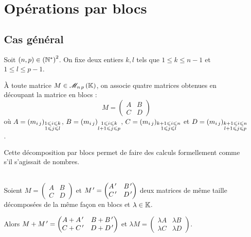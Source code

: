 \section{Opérations par blocs}

\subsection{Cas général}

Soit \(\left(n,p\right)\in\left(\mathbb{N}^*\right)^2\). On fixe deux entiers \(k,l\) tels que \(1\leq k\leq n-1\) et \(1\leq l\leq p-1\).

À toute matrice \(M\in\M{n\,p}\), on associe quatre matrices obtenues en découpant la matrice en blocs : \[M=\begin{pmatrix}
A & B \\
C & D
\end{pmatrix}\] où \(A=\left(m_{i\,j}\right)_{\substack{1\leqslant i\leqslant k \\ 1\leqslant j\leqslant l}}\), \(B=\left(m_{i\,j}\right)_{\substack{1\leqslant i\leqslant k \\ l+1\leqslant j\leqslant p}}\), \(C=\left(m_{i\,j}\right)_{\substack{k+1\leqslant i\leqslant n \\ 1\leqslant j\leqslant l}}\) et \(D=\left(m_{i\,j}\right)_{\substack{k+1\leqslant i\leqslant n \\ l+1\leqslant j\leqslant p}}\).

Cette décomposition par blocs permet de faire des calculs formellement comme s'il s'agissait de nombres.

\begin{prop}~\\
Soient \(M=\begin{pmatrix}
A & B \\
C & D
\end{pmatrix}\) et \(M^{\,\prime}=\begin{pmatrix}
A^{\,\prime} & B^{\,\prime} \\
C^{\,\prime} & D^{\,\prime}
\end{pmatrix}\) deux matrices de même taille décomposées de la même façon en blocs et \(\lambda\in\mathbb{K}\).

Alors \(M+M^{\,\prime}=\begin{pmatrix}
A+A^{\,\prime} & B+B^{\,\prime} \\
C+C^{\,\prime} & D+D^{\,\prime}
\end{pmatrix}\) et \(\lambda M=\begin{pmatrix}
\lambda A & \lambda B \\
\lambda C & \lambda D
\end{pmatrix}\).
\end{prop}

